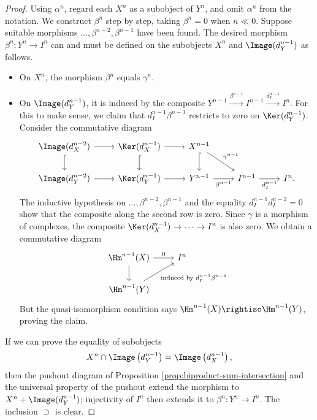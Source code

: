 \begin{proof}
	Using $\alpha^n$, regard each $X^n$ as a subobject of $Y^n$, and omit
	$\alpha^n$ from the notation. We construct $\beta^n$ step by step, taking
	$\beta^n=0$ when $n\ll0$. Suppose suitable morphisms
	$\ldots,\beta^{n-2},\beta^{n-1}$ have been found. The desired morphism
	$\beta^n:Y^n\to I^n$ can and must be defined on the subobjects $X^n$ and
	$\Image(d_Y^{n-1})$ as follows.
	\begin{itemize}
		\item On $X^n$, the morphism $\beta^n$ equals $\gamma^n$.
		\item On $\Image(d_Y^{n-1})$, it is induced by the composite
		$Y^{n-1}\xrightarrow{\beta^{n-1}}I^{n-1}
		\xrightarrow{d_I^{n-1}}I^n$. For this to make sense, we claim that
		$d_I^{n-1}\beta^{n-1}$ restricts to zero on
		$\Ker(d_Y^{n-1})$. Consider the commutative diagram
		\[\begin{tikzcd}
			\Image(d_X^{n-2}) \arrow[r] \arrow[hookrightarrow, d] & \Ker(d_X^{n-1}) \arrow[r] \arrow[hookrightarrow, d] & X^{n-1} \arrow[rd, "{\gamma^{n-1}}"] \arrow[hookrightarrow, d] & & \\
			\Image(d_Y^{n-2}) \arrow[r] & \Ker(d_Y^{n-1}) \arrow[r] & Y^{n-1} \arrow[r, "{\beta^{n-1}}"'] & I^{n-1} \arrow[r, "{d_I^{n-1}}"'] & I^n .
		\end{tikzcd}\]
		The inductive hypothesis on $\ldots,\beta^{n-2},\beta^{n-1}$ and the
		equality $d_I^{n-1}d_I^{n-2}=0$ show that the composite along the
		second row is zero. Since $\gamma$ is a morphism of complexes, the
		composite $\Ker(d_X^{n-1})\to\cdots\to I^n$ is also zero. We obtain a
		commutative diagram
		\[\begin{tikzcd}
			\Hm^{n-1}(X) \arrow[d] \arrow[r, "0"] & I^n \\
			\Hm^{n-1}(Y) \arrow[ru, "\text{induced by $d_I^{n-1} \beta^{n-1}$}"'] &
		\end{tikzcd}\]
		But the quasi-isomorphism condition says
		$\Hm^{n-1}(X)\rightiso\Hm^{n-1}(Y)$, proving the claim.
	\end{itemize}

	If we can prove the equality of subobjects
	\[ X^n \cap \Image\left(d_Y^{n-1} \right) = \Image\left( d_X^{n-1} \right), \]
	then the pushout diagram of Proposition
	\ref{prop:biproduct-sum-intersection} and the universal property of the
	pushout extend the morphism to $X^n+\Image(d_Y^{n-1})$; injectivity of
	$I^n$ then extends it to $\beta^n:Y^n\to I^n$. The inclusion $\supset$ is
	clear.


\end{proof}
